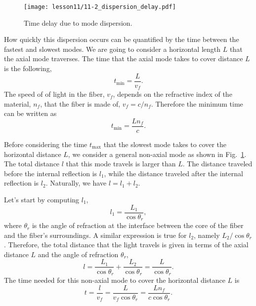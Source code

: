 \begin{figure}
    \centering
    \texttt{[image: lesson11/11-2\_dispersion\_delay.pdf]}
    \caption[Time delay due to mode dispersion]{Time delay due to mode dispersion.}
    \label{fig:11-2_dispersion_delay}
\end{figure}

How quickly this dispersion occurs can be quantified by the time between the fastest and slowest modes.
We are going to consider a horizontal length $L$ that the axial mode traverses.
The time that the axial mode takes to cover distance $L$ is the following,
\begin{equation}
    t_{\min } =\frac{L}{v_f}.
\end{equation}
The speed of of light in the fiber, $v_f$, depends on the refractive index of the material, $n_f$, that the fiber is made of, $v_f = c / n_f$.
Therefore the minimum time can be written as
\begin{equation}
    t_{\min } =\frac{Ln_f}{c}.
\end{equation}

Before considering the time $t_{\max}$ that the slowest mode takes to cover the horizontal distance $L$, we consider a general non-axial mode as shown in Fig.~\ref{fig:11-2_dispersion_delay}.
The total distance $l$ that this mode travels is larger than $L$.
The distance traveled before the internal reflection is $l_1$, while the distance traveled after the internal reflection is $l_2$.
Naturally, we have $l = l_1 + l_2$.

Let's start by computing $l_1$,
\begin{equation}
    l_1=\frac{L_1}{\cos \theta_r},
\end{equation}
where $\theta_r$ is the angle of refraction at the interface between the core of the fiber and the fiber's surroundings.
A similar expression is true for $l_2$, namely $L_2 / \cos \theta_r$.
Therefore, the total distance that the light travels is given in terms of the axial distance $L$ and the angle of refraction $\theta_r$,
\begin{equation}
    l=\frac{L_1}{\cos \theta_r}+\frac{L_2}{\cos \theta_r}=\frac{L}{\cos \theta_r}.
\end{equation}
The time needed for this non-axial mode to cover the horizontal distance $L$ is
\begin{equation}
    t = \frac{l}{v_f} = \frac{L}{v_f \cos \theta_r} = \frac{L n_f}{c \cos \theta_r}.
    \label{eq:11-2_time_nonaxial}
\end{equation}

